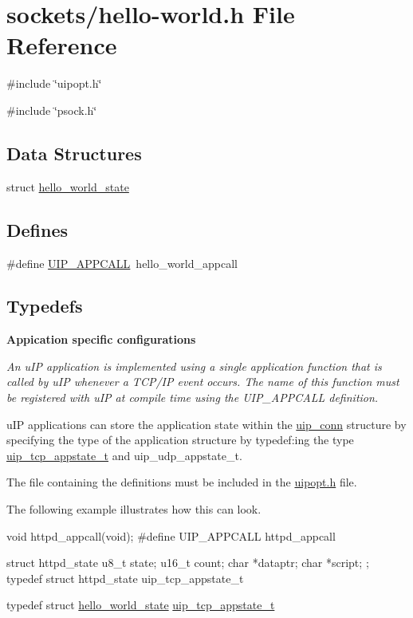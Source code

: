 \hypertarget{hello-world_8h}{
\section{sockets/hello-\/world.h File Reference}
\label{hello-world_8h}
}
{\ttfamily \#include \char`\"{}uipopt.h\char`\"{}}\par
{\ttfamily \#include \char`\"{}psock.h\char`\"{}}\par
\subsection*{Data Structures}
\begin{DoxyCompactItemize}
\item 
struct \hyperlink{structhello__world__state}{hello\_\-world\_\-state}
\end{DoxyCompactItemize}
\subsection*{Defines}
\begin{DoxyCompactItemize}
\item 
\#define \hyperlink{hello-world_8h_ae28f6cb60e86088d8886d0f804b4f37c}{UIP\_\-APPCALL}~hello\_\-world\_\-appcall
\end{DoxyCompactItemize}
\subsection*{Typedefs}
\begin{Indent}{\bf Appication specific configurations}\par
{\em \label{_amgrp7ca3fa6f6e17e833a8efbc08a22e4439}
 An uIP application is implemented using a single application function that is called by uIP whenever a TCP/IP event occurs. The name of this function must be registered with uIP at compile time using the UIP\_\-APPCALL definition.

uIP applications can store the application state within the \hyperlink{structuip__conn}{uip\_\-conn} structure by specifying the type of the application structure by typedef:ing the type \hyperlink{unionuip__tcp__appstate__t}{uip\_\-tcp\_\-appstate\_\-t} and uip\_\-udp\_\-appstate\_\-t.

The file containing the definitions must be included in the \hyperlink{uipopt_8h}{uipopt.h} file.

The following example illustrates how this can look. 
\begin{DoxyCode}
void httpd_appcall(void);
#define UIP_APPCALL     httpd_appcall

struct httpd_state {
  u8_t state;
  u16_t count;
  char *dataptr;
  char *script;
};
typedef struct httpd_state uip_tcp_appstate_t
\end{DoxyCode}
 }\begin{DoxyCompactItemize}
\item 
typedef struct \hyperlink{structhello__world__state}{hello\_\-world\_\-state} \hyperlink{group__uipopt_ga69646a81a922033c5281445a71f8ffed}{uip\_\-tcp\_\-appstate\_\-t}
\end{DoxyCompactItemize}
\end{Indent}
